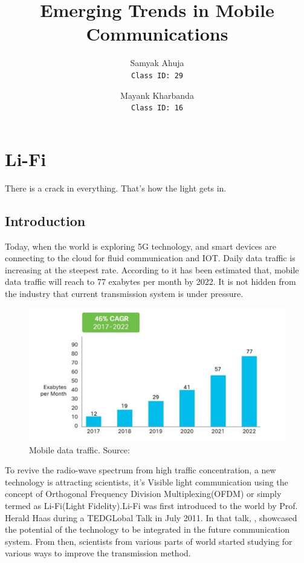 \documentclass{article}
\title{Emerging Trends in Mobile Communications}
\author{
    Samyak Ahuja \\
    \texttt{Class ID: 29}
    \and
    Mayank Kharbanda \\
    \texttt{Class ID: 16}
}
\begin{document}
\maketitle

\section{Li-Fi}

\epigraph{There is a crack in everything.
That's how the light gets in.}{\parencite{selected-poem}}



\subsection{Introduction}

Today, when the world is exploring 5G technology, and smart devices are
connecting to the cloud for fluid communication and IOT.  Daily data traffic is
increasing at the steepest rate. According to \textcite{cisco19} it has been
estimated that, mobile data traffic will reach to 77 exabytes per month by
2022. It is not hidden from the industry that current transmission system is
under pressure.\\

\begin{figure}[!h]
  \includegraphics{res/traffic_trend_li_fi.PNG}
    \caption{Mobile data traffic. Source: \parencite{cisco19}}
  \label{fig:traffic_trend_li_fi}
\end{figure}


To revive the radio-wave spectrum from high traffic concentration, a new
technology is attracting scientists, it's Visible light communication using the
concept of Orthogonal Frequency Division Multiplexing(OFDM) or simply termed as
Li-Fi(Light Fidelity).\newline Li-Fi was first introduced to the world by Prof.
Herald Haas during a TEDGLobal Talk in July 2011. In that talk,
\textcite{hass11}, showcased the potential of the technology to be integrated
in the future communication system. From then, scientists from various parts of
world started studying for various ways to improve the transmission method.\\
\end{document}
